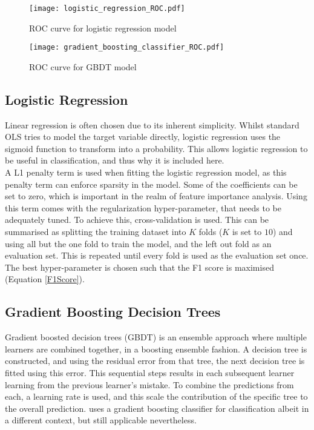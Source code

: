 \documentclass[11pt]{article}
\begin{document}
\begin{figure}
    \centering
    \texttt{[image: logistic\_regression\_ROC.pdf]}
    \caption{ROC curve for logistic regression model}
    \label{fig:logisiticRegressionROC}
\end{figure}

\begin{figure}
    \centering
    \texttt{[image: gradient\_boosting\_classifier\_ROC.pdf]}
    \caption{ROC curve for GBDT model}
    \label{fig:ROC_GDBT}
\end{figure}
\subsection{Logistic Regression}
Linear regression is often chosen due to its inherent simplicity. Whilst standard OLS tries to model the target variable directly, logistic regression uses the sigmoid function to transform into a probability. This allows logistic regression to be useful in classification, and thus why it is included here. \\

A L1 penalty term is used when fitting the logistic regression model, as this penalty term can enforce sparsity in the model. Some of the coefficients can be set to zero, which is important in the realm of feature importance analysis. Using this term comes with the regularization hyper-parameter, that needs to be adequately tuned. To achieve this, cross-validation is used. This can be summarised as splitting the training dataset into $K$ folds ($K$ is set to $10$) and using all but the one fold to train the model, and the left out fold as an evaluation set. This is repeated until every fold is used as the evaluation set once. The best hyper-parameter is chosen such that the F1 score is maximised (Equation \ref{F1Score}).

\subsection{Gradient Boosting Decision Trees}
Gradient boosted decision trees (GBDT) is an ensemble approach where multiple learners are combined together, in a boosting ensemble fashion. A decision tree is constructed, and using the residual error from that tree, the next decision tree is fitted using this error. This sequential steps results in each subsequent learner learning from the previous learner's mistake. To combine the predictions from each, a learning rate is used, and this scale the contribution of the specific tree to the overall prediction. \cite{gbc_paper} uses a gradient boosting classifier for classification albeit in a different context, but still applicable nevertheless. \\
\end{document}
